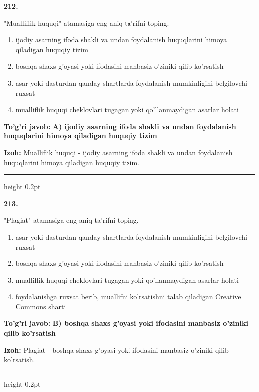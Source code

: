\documentclass[10pt,a4paper,oneside]{article}
\begin{document}
\noindent\textbf{\color{ink}212.}
\par
"Mualliflik huquqi" atamasiga eng aniq ta'rifni toping.
\begin{enumerate}[label=\Alph*),leftmargin=9mm]
\item ijodiy asarning ifoda shakli va undan foydalanish huquqlarini himoya qiladigan huquqiy tizim
\item boshqa shaxs g'oyasi yoki ifodasini manbasiz o'ziniki qilib ko'rsatish
\item asar yoki dasturdan qanday shartlarda foydalanish mumkinligini belgilovchi ruxsat
\item mualliflik huquqi cheklovlari tugagan yoki qo'llanmaydigan asarlar holati
\end{enumerate}
\begin{tcolorbox}[enhanced,breakable,colback=teal!4,colframe=teal!50!black,boxrule=0.5pt,arc=1.1mm,left=3mm,right=3mm,top=1.7mm,bottom=1.7mm,before skip=2mm,after skip=2mm]
\textbf{\color{teal}To'g'ri javob:} \textbf{A) ijodiy asarning ifoda shakli va undan foydalanish huquqlarini himoya qiladigan huquqiy tizim}
\par\smallskip
\textbf{Izoh:} Mualliflik huquqi - ijodiy asarning ifoda shakli va undan foydalanish huquqlarini himoya qiladigan huquqiy tizim.
\end{tcolorbox}
\vspace{2mm}\hrule height 0.2pt \vspace{3mm}

\noindent\textbf{\color{ink}213.}
\par
"Plagiat" atamasiga eng aniq ta'rifni toping.
\begin{enumerate}[label=\Alph*),leftmargin=9mm]
\item asar yoki dasturdan qanday shartlarda foydalanish mumkinligini belgilovchi ruxsat
\item boshqa shaxs g'oyasi yoki ifodasini manbasiz o'ziniki qilib ko'rsatish
\item mualliflik huquqi cheklovlari tugagan yoki qo'llanmaydigan asarlar holati
\item foydalanishga ruxsat berib, muallifni ko'rsatishni talab qiladigan Creative Commons sharti
\end{enumerate}
\begin{tcolorbox}[enhanced,breakable,colback=teal!4,colframe=teal!50!black,boxrule=0.5pt,arc=1.1mm,left=3mm,right=3mm,top=1.7mm,bottom=1.7mm,before skip=2mm,after skip=2mm]
\textbf{\color{teal}To'g'ri javob:} \textbf{B) boshqa shaxs g'oyasi yoki ifodasini manbasiz o'ziniki qilib ko'rsatish}
\par\smallskip
\textbf{Izoh:} Plagiat - boshqa shaxs g'oyasi yoki ifodasini manbasiz o'ziniki qilib ko'rsatish.
\end{tcolorbox}
\vspace{2mm}\hrule height 0.2pt \vspace{3mm}
\end{document}
